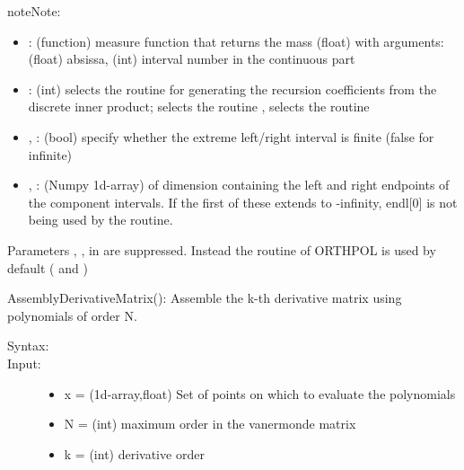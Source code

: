 \documentclass[letterpaper,10pt,english]{sphinxmanual}
\begin{document}
\begin{fulllineitems}
\begin{notice}{note}{Note:}
\begin{itemize}
\item {} 
: (function) measure function that returns the mass (float) with arguments:  (float) absissa,  (int) interval number in the continuous part

\item {} 
: (int) selects the routine for generating the recursion coefficients from the discrete inner product;  selects the routine ,  selects the routine 

\item {} 
, : (bool) specify whether the extreme left/right interval is finite (false for infinite)

\item {} 
, : (Numpy 1d-array) of dimension  containing the left and right endpoints of the component intervals. If the first of these extends to -infinity, endl{[}0{]} is not being used by the routine.

\end{itemize}

Parameters , ,  in \footnotemark[4] are suppressed. Instead the routine  of ORTHPOL \footnotemark[4] is used by default ( and )
\end{notice}

\begin{fulllineitems}
\label{index:SpectralToolbox.Spectral1D.Poly1D.AssemblyDerivativeMatrix}
AssemblyDerivativeMatrix(): Assemble the k-th derivative matrix using polynomials of order N.
\begin{description}
\item[{Syntax:}] \leavevmode
{}

\item[{Input:}] \leavevmode\begin{itemize}
\item {} 
x = (1d-array,float) Set of points on which to evaluate the polynomials

\item {} 
N = (int) maximum order in the vanermonde matrix

\item {} 
k = (int) derivative order


\end{itemize}
\end{description}
\end{fulllineitems}
\end{fulllineitems}
\end{document}
